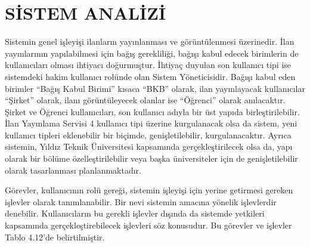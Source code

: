 \chapter{SİSTEM ANALİZİ}

Sistemin genel işleyişi ilanların yayınlanması ve görüntülenmesi üzerinedir. İlan
yayınlarının yapılabilmesi için bağış gerekliliği, bağışı kabul edecek birimlerin de
kullanıcıları olması ihtiyacı doğurmuştur. İhtiyaç duyulan son kullanıcı tipi ise
sistemdeki hakim kullanıcı rolünde olan Sistem Yöneticisidir. Bağışı kabul eden
birimler “Bağış Kabul Birimi” kısaca “BKB” olarak, ilan yayınlayacak kullanıcılar
“Şirket” olarak, ilanı görüntüleyecek olanlar ise “Öğrenci” olarak anılacaktır. Şirket ve
Öğrenci kullanıcıları, son kullanıcı adıyla bir üst yapıda birleştirilebilir. İlan Yayınlama
Servisi 4 kullanıcı tipi üzerine kurgulanacak olsa da sistem, yeni kullanıcı tipleri
eklenebilir bir biçimde, genişletilebilir, kurgulanacaktır. Ayrıca sistemin, Yıldız Teknik
Üniversitesi kapsamında gerçekleştirilecek olsa da, yapı olarak bir bölüme
özelleştirilebilir veya başka üniversiteler için de genişletilebilir olarak tasarlanması
planlanmaktadır.

Görevler, kullanıcının rolü gereği, sistemin işleyişi için
yerine getirmesi gereken işlevler olarak tanımlanabilir. Bir nevi sistemin amacına
yönelik işlevlerdir denebilir. Kullanıcıların bu gerekli işlevler dışında da sistemde
yetkileri kapsamında gerçekleştirebilecek işlevleri söz konusudur. Bu görevler ve
işlevler Tablo 4.12’de belirtilmiştir.

